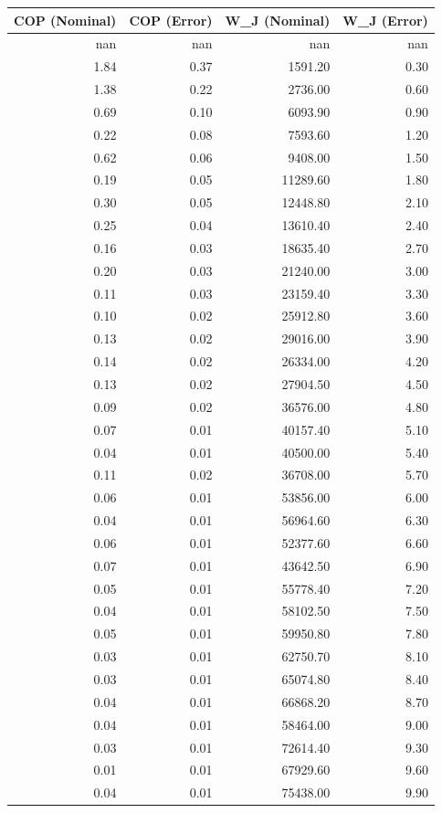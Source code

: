 \begin{tabular}{rrrr}
\toprule
COP (Nominal) & COP (Error) & W_J (Nominal) & W_J (Error) \\
\midrule
nan & nan & nan & nan \\
1.84 & 0.37 & 1591.20 & 0.30 \\
1.38 & 0.22 & 2736.00 & 0.60 \\
0.69 & 0.10 & 6093.90 & 0.90 \\
0.22 & 0.08 & 7593.60 & 1.20 \\
0.62 & 0.06 & 9408.00 & 1.50 \\
0.19 & 0.05 & 11289.60 & 1.80 \\
0.30 & 0.05 & 12448.80 & 2.10 \\
0.25 & 0.04 & 13610.40 & 2.40 \\
0.16 & 0.03 & 18635.40 & 2.70 \\
0.20 & 0.03 & 21240.00 & 3.00 \\
0.11 & 0.03 & 23159.40 & 3.30 \\
0.10 & 0.02 & 25912.80 & 3.60 \\
0.13 & 0.02 & 29016.00 & 3.90 \\
0.14 & 0.02 & 26334.00 & 4.20 \\
0.13 & 0.02 & 27904.50 & 4.50 \\
0.09 & 0.02 & 36576.00 & 4.80 \\
0.07 & 0.01 & 40157.40 & 5.10 \\
0.04 & 0.01 & 40500.00 & 5.40 \\
0.11 & 0.02 & 36708.00 & 5.70 \\
0.06 & 0.01 & 53856.00 & 6.00 \\
0.04 & 0.01 & 56964.60 & 6.30 \\
0.06 & 0.01 & 52377.60 & 6.60 \\
0.07 & 0.01 & 43642.50 & 6.90 \\
0.05 & 0.01 & 55778.40 & 7.20 \\
0.04 & 0.01 & 58102.50 & 7.50 \\
0.05 & 0.01 & 59950.80 & 7.80 \\
0.03 & 0.01 & 62750.70 & 8.10 \\
0.03 & 0.01 & 65074.80 & 8.40 \\
0.04 & 0.01 & 66868.20 & 8.70 \\
0.04 & 0.01 & 58464.00 & 9.00 \\
0.03 & 0.01 & 72614.40 & 9.30 \\
0.01 & 0.01 & 67929.60 & 9.60 \\
0.04 & 0.01 & 75438.00 & 9.90 \\

\end{tabular}
